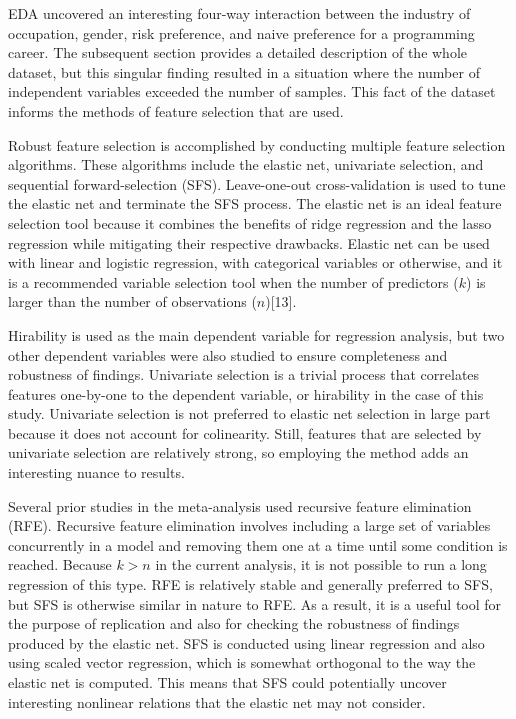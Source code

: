 \documentclass[review]{elsarticle}
\begin{document}
EDA uncovered an interesting four-way interaction between
the industry of occupation, gender, risk preference, and naive preference for a programming career.
The subsequent section provides a detailed description of the whole dataset,
but this singular finding resulted in a situation where the number of independent variables exceeded the number of samples.
This fact of the dataset informs the methods of feature selection that are used.

Robust feature selection is accomplished by conducting multiple feature selection algorithms.
These algorithms include the elastic net, univariate selection, and sequential forward-selection (SFS).
Leave-one-out cross-validation is used to tune the elastic net and terminate the SFS process.
The elastic net is an ideal feature selection tool because it combines the benefits of ridge regression and the lasso regression
while mitigating their respective drawbacks.
Elastic net can be used with linear and logistic regression, with categorical variables or otherwise,
and it is a recommended variable selection tool
when the number of predictors ($k$) is larger than the number of observations ($n$)[13].

Hirability is used as the main dependent variable for regression analysis,
but two other dependent variables were also studied to ensure completeness and robustness of findings.
Univariate selection is a trivial process that correlates features one-by-one to the dependent variable,
or hirability in the case of this study.
Univariate selection is not preferred to elastic net selection in large part because it does not account for colinearity.
Still, features that are selected by univariate selection are relatively strong, so employing the method adds an interesting nuance to results.

Several prior studies in the meta-analysis used recursive feature elimination (RFE).
Recursive feature elimination involves including a large set of variables concurrently in a model and removing them one at a time
until some condition is reached.
Because $k > n$ in the current analysis, it is not possible to run a long regression of this type.
RFE is relatively stable and generally preferred to SFS, but SFS is otherwise similar in nature to RFE.
As a result, it is a useful tool for the purpose of replication and also for checking the robustness of findings produced by the elastic net.
SFS is conducted using linear regression and also using scaled vector regression, which is somewhat orthogonal to the way the elastic net is computed.
This means that SFS could potentially uncover interesting nonlinear relations that the elastic net may not consider.
\end{document}
